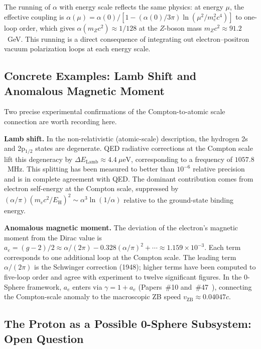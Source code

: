 \documentclass[%
 reprint, amsmath,amssymb, aps, prb, ]{revtex4-2}
\numberwithin{equation}{section}
\begin{document}
The running of $\alpha$ with energy scale reflects the same physics: at energy $\mu$, the effective coupling is $\alpha(\mu) = \alpha(0)/[1 - (\alpha(0)/3\pi)\ln(\mu^2/m_e^2 c^4)]$ to one-loop order, which gives $\alpha(m_Z c^2) \approx 1/128$ at the $Z$-boson mass $m_Z c^2 \approx 91.2$~GeV. This running is a direct consequence of integrating out electron--positron vacuum polarization loops at each energy scale.

\subsection{Concrete Examples: Lamb Shift and Anomalous Magnetic Moment}
\label{app:eft_examples}

Two precise experimental confirmations of the Compton-to-atomic scale connection are worth recording here.

\textbf{Lamb shift.} In the non-relativistic (atomic-scale) description, the hydrogen 2s and 2p$_{1/2}$ states are degenerate. QED radiative corrections at the Compton scale lift this degeneracy by $\Delta E_{\text{Lamb}} \approx 4.4~\mu\text{eV}$, corresponding to a frequency of $1057.8$~MHz. This splitting has been measured to better than $10^{-6}$ relative precision and is in complete agreement with QED. The dominant contribution comes from electron self-energy at the Compton scale, suppressed by $(\alpha/\pi)(m_e c^2/E_{\text{H}})^2 \sim \alpha^3 \ln(1/\alpha)$ relative to the ground-state binding energy.

\textbf{Anomalous magnetic moment.} The deviation of the electron's magnetic moment from the Dirac value is $a_e = (g-2)/2 \approx \alpha/(2\pi) - 0.328(\alpha/\pi)^2 + \cdots \approx 1.159\times10^{-3}$. Each term corresponds to one additional loop at the Compton scale. The leading term $\alpha/(2\pi)$ is the Schwinger correction (1948); higher terms have been computed to five-loop order and agree with experiment to twelve significant figures. In the 0-Sphere framework, $a_e$ enters via $\gamma = 1 + a_e$ (Papers~\#10 and~\#47~\cite{hanamura10,hanamura47}), connecting the Compton-scale anomaly to the macroscopic ZB speed $v_{\text{ZB}} \approx 0.04047c$.

\subsection{The Proton as a Possible 0-Sphere Subsystem: Open Question}
\label{app:eft_proton}
\end{document}
